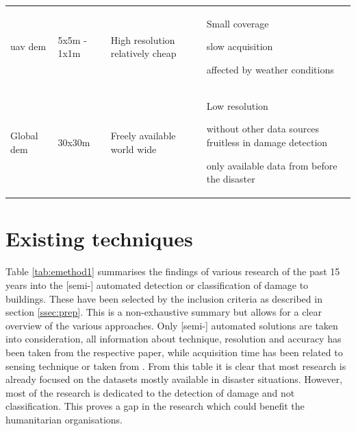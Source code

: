 \begin{table} [!h]
{\begin{tabular}{p{2cm}p{2cm}p{3cm}p{3cm}}
			\ac{uav} \ac{dem} & 5x5m - 1x1m &\begin{itemize}[leftmargin=.1cm,noitemsep,topsep=0pt]{\item High resolution relatively cheap }\end{itemize}&\begin{itemize}[leftmargin=.1cm,noitemsep,topsep=0pt]{\item Small coverage \item slow acquisition \item affected by weather conditions}\end{itemize}\\
			Global \ac{dem} &30x30m&\begin{itemize}[leftmargin=.1cm,noitemsep,topsep=0pt]{\item Freely available world wide}\end{itemize}&\begin{itemize}[leftmargin=.1cm,noitemsep,topsep=0pt]{\item Low resolution \item without other data sources fruitless in damage detection \item only available data from before the disaster}\end{itemize} \\
			\bottomrule
		\end{tabular}
	}
	\label{tab:edatasets}
\end{table}


\section{Existing techniques}\label{sec:etech}
Table \ref{tab:emethod1} summarises the findings of various research of the past 15 years into the [semi-] automated detection or classification of damage to buildings. These have been selected by the inclusion criteria as described in section \ref{ssec:prep}. This is a non-exhaustive summary but allows for a clear overview of the various approaches. Only [semi-] automated solutions are taken into consideration, all information about technique, resolution and accuracy has been taken from the respective paper, while acquisition time has been related to sensing technique or taken from \citet{Kerle2008}. From this table it is clear that most research is already focused on the datasets mostly available in disaster situations. However, most of the research is dedicated to the detection of damage and not classification. This proves a gap in the research which could benefit the humanitarian organisations. \\

